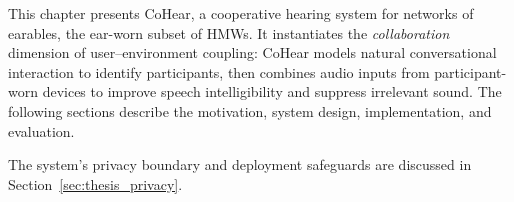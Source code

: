 This chapter presents CoHear, a cooperative hearing system for networks of earables, the ear-worn subset of HMWs. It instantiates the \textit{collaboration} dimension of user--environment coupling: CoHear models natural conversational interaction to identify participants, then combines audio inputs from participant-worn devices to improve speech intelligibility and suppress irrelevant sound.
The following sections describe the motivation, system design, implementation, and evaluation.


% 





The system's privacy boundary and deployment safeguards are discussed in Section~\ref{sec:thesis_privacy}.
